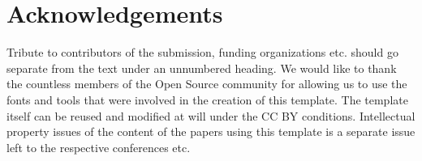 \section*{Acknowledgements} %
Tribute to contributors of the submission, funding organizations etc. should go separate from the text under an unnumbered heading. We would like to thank the countless members of the Open Source community for allowing us to use the fonts and tools that were involved in the creation of this template. The template itself can be reused and modified at will under the CC BY conditions. Intellectual property issues of the content of the papers using this template is a separate issue left to the respective conferences etc. 

\printbibliography 
